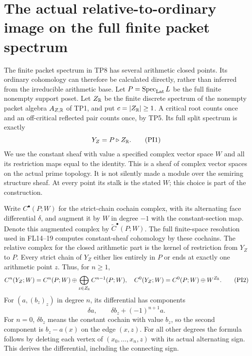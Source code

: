 \section{The actual relative-to-ordinary image on the full finite packet spectrum}
\label{sec:packet-interior}

The finite packet spectrum in TP8 has several arithmetic closed
points. Its ordinary cohomology can therefore be calculated directly,
rather than inferred from the irreducible arithmetic base. Let
$P=\operatorname{Spec}_{\rm Lat} L$ be the full finite nonempty support poset. Let $Z_\mathbb R$
be the finite discrete spectrum of the nonempty packet algebra
$A_{Z,\mathbb R}$ of TP1, and put $c=|Z_\mathbb R|\ge1$. A critical root counts once and an
off-critical reflected pair counts once, by TP5. Its full split
spectrum is exactly
\[
 Y_Z=P\triangleright Z_\mathbb R.
 \tag{PI1}\label{pi:space}
\]
We use the constant sheaf with value a specified complex vector
space $W$ and all its restriction maps equal to the identity.
This is a sheaf of complex vector spaces on the actual prime
topology. It is not silently made a module over the semiring
structure sheaf. At every point its stalk is the stated $W$;
this choice is part of the construction.

Write $C^\bullet(P;W)$ for the strict-chain cochain complex,
with its alternating face differential $\delta$, and augment it
by $W$ in degree $-1$ with the constant-section map. Denote this
augmented complex by $\widetilde C^\bullet(P;W)$. The full
finite-space resolution used in FL14--19 computes constant-sheaf
cohomology by these cochains. The relative complex for the closed
arithmetic part is the kernel of restriction from $Y_Z$ to $P$.
Every strict chain of $Y_Z$ either lies entirely in $P$ or ends
at exactly one arithmetic point $z$. Thus, for $n\ge1$,
\[
 C^n(Y_Z;W)=C^n(P;W)\oplus
       \bigoplus_{z\in Z_\mathbb R}C^{n-1}(P;W),
 \quad
 C^0(Y_Z;W)=C^0(P;W)\oplus W^{Z_\mathbb R}.
 \tag{PI2}\label{pi:chains}
\]
For $(a,(b_z)_z)$ in degree $n$, its differential has components
\[
 \delta a,\qquad
 \delta b_z+(-1)^{n+1}a.
 \tag{PI3}\label{pi:differential}
\]
For $n=0$, $\delta b_z$ means the constant cochain with value
$b_z$, so the second component is $b_z-a(x)$ on the edge $(x,z)$.
For all other degrees the formula follows by deleting each
vertex of $(x_0,\ldots,x_n,z)$ with its actual alternating sign.
This derives the differential, including the connecting sign.

